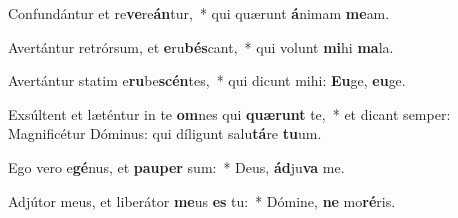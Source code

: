 \item Confundántur et re\textbf{ve}re\textbf{án}tur,~* qui quærunt \textbf{á}nimam \textbf{me}am.
\item Avertántur retrórsum, et \textbf{e}ru\textbf{bés}cant,~* qui volunt \textbf{mi}hi \textbf{ma}la.
\item Avertántur statim e\textbf{ru}be\textbf{scén}tes,~* qui dicunt mihi: \textbf{Eu}ge, \textbf{eu}ge.
\item Exsúltent et læténtur in te \textbf{om}nes qui \textbf{quæ}\textbf{runt} te,~* et dicant semper: Magnificétur Dóminus: qui díligunt salu\textbf{tá}re \textbf{tu}um.
\item Ego vero e\textbf{gé}nus, et \textbf{pau}\textbf{per} sum:~* Deus, \textbf{ád}ju\textbf{va} me.
\item Adjútor meus, et liberátor \textbf{me}us \textbf{es} tu:~* Dómine, \textbf{ne} mo\textbf{ré}ris.
